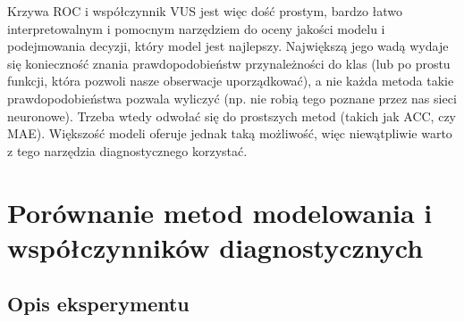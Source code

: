 \documentclass{mini}
\begin{document}
Krzywa ROC i współczynnik VUS jest więc dość prostym, bardzo łatwo interpretowalnym i pomocnym narzędziem do oceny jakości modelu i podejmowania decyzji, który model jest najlepszy. Największą jego wadą wydaje się konieczność znania prawdopodobieństw przynależności do klas (lub po prostu funkcji, która pozwoli nasze obserwacje uporządkować), a nie każda metoda takie prawdopodobieństwa pozwala wyliczyć (np. nie robią tego poznane przez nas sieci neuronowe). Trzeba wtedy odwołać się do prostszych metod (takich jak ACC, czy MAE). Większość modeli oferuje jednak taką możliwość, więc niewątpliwie warto z tego narzędzia diagnostycznego korzystać.

\chapter{Porównanie metod modelowania i współczynników diagnostycznych}

\section{Opis eksperymentu}
\end{document}
